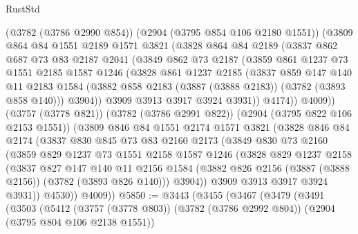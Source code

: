 \begin{lexlean}{RustStd}
\begin{coremodule}
        (@3782 (@3786 @2990 @854))
        (@2904 (@3795 @854 @106 @2180 @1551))
        (@3809
          @864
          @84
          @1551
          @2189
          @1571
          @3821
          (@3828
            @864
            @84
            @2189
            (@3837
              @862
              @687
              @73
              @83
              @2187
              @2041
              (@3849
                @862
                @73
                @2187
                (@3859
                  @861
                  @1237
                  @73
                  @1551
                  @2185
                  @1587
                  @1246
                  (@3828
                    @861
                    @1237
                    @2185
                    (@3837
                      @859
                      @147
                      @140
                      @11
                      @2183
                      @1584
                      (@3882 @858 @2183 (@3887 (@3888 @2183)) (@3782 (@3893 @858 @140)))
                      @3904))
                  @3909
                  @3913
                  @3917
                  @3924
                  @3931))
              @4174))
          @4009))
      (@3757 (@3778 @821))
      (@3782 (@3786 @2991 @822))
      (@2904 (@3795 @822 @106 @2153 @1551))
      (@3809
        @846
        @84
        @1551
        @2174
        @1571
        @3821
        (@3828
          @846
          @84
          @2174
          (@3837
            @830
            @845
            @73
            @83
            @2160
            @2173
            (@3849
              @830
              @73
              @2160
              (@3859
                @829
                @1237
                @73
                @1551
                @2158
                @1587
                @1246
                (@3828
                  @829
                  @1237
                  @2158
                  (@3837
                    @827
                    @147
                    @140
                    @11
                    @2156
                    @1584
                    (@3882 @826 @2156 (@3887 (@3888 @2156)) (@3782 (@3893 @826 @140)))
                    @3904))
                @3909
                @3913
                @3917
                @3924
                @3931))
            @4530))
        @4009))
@5850 := @3443
    (@3455
      (@3467
        (@3479
          (@3491
            (@3503
              (@5412
                (@3757 (@3778 @803))
                (@3782 (@3786 @2992 @804))
                (@2904 (@3795 @804 @106 @2138 @1551))

\end{coremodule}
\end{lexlean}
